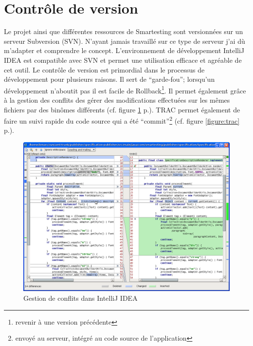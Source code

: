 \section{Contrôle de version}
Le projet ainsi que différentes ressources de Smartesting sont versionnées sur un serveur Subversion (SVN). N'ayant jamais travaillé sur ce type de serveur j'ai dù m'adapter et comprendre le concept. L'environnement de développement IntelliJ IDEA est compatible avec SVN et permet une utilisation efficace et agréable de cet outil. Le contrôle de version est primordial dans le processus de développement pour plusieurs raisons. Il sert de ``garde-fou''; lorsqu'un développement n'aboutit pas il est facile de Rollback\footnote{revenir à une version précédente}. Il permet également grâce à la gestion des conflits des gérer des modifications effectuées sur les mêmes fichiers par des binômes différents (cf. figure \ref{figure:ideaMerge} p.\pageref{figure:ideaMerge}). TRAC permet également de faire un suivi rapide du code source qui a été ``commit''\footnote{envoyé au serveur, intégré au code source de l'application} (cf. figure \ref{figure:trac} p.\pageref{figure:trac}).
\begin{figure}[!ht]
\centering
\includegraphics[width=\textwidth]{Illustrations/ideaMerge.png}
\caption{Gestion de conflits dans IntelliJ IDEA}
\label{figure:ideaMerge}
\end{figure}
